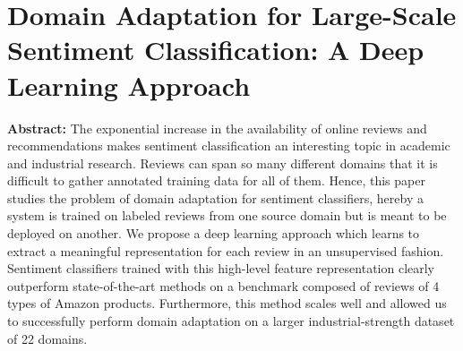 \section{Domain Adaptation for Large-Scale Sentiment Classification: A Deep Learning Approach}
\textbf{Abstract:}\cite{glorot2011domain}
The exponential increase in the availability of online reviews and recommendations makes sentiment classification an interesting topic in academic and industrial research. Reviews can span so many different domains that it is difficult to gather annotated training data for all of them. Hence, this paper studies the problem of domain adaptation for sentiment classifiers, hereby a system is trained on labeled reviews from one source domain but is meant to be deployed on another. We propose a deep learning approach which learns to extract a meaningful representation for each review in an unsupervised fashion. Sentiment classifiers trained with this high-level feature representation clearly outperform state-of-the-art methods on a benchmark composed of reviews of 4 types of Amazon products. Furthermore, this method scales well and allowed us to successfully perform domain adaptation on a larger industrial-strength dataset of 22 domains.